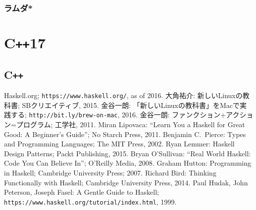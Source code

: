 \documentclass[a5paper,draft]{jsbook}
\newcommand{\programminglanguage}[1]{\textsf{#1}}
\newcommand{\cxx}{\programminglanguage{C}\texttt{++}}
\begin{document}

\section{ラムダ*}

\part{\cxx17}
\chapter{\cxx}

\begin{thebibliography}{99}
 Haskell.org; \texttt{https://www.haskell.org/}, as of 2016.
 大角祐介: 新しいLinuxの教科書; SBクリエイティブ, 2015.
 金谷一朗: 「新しいLinuxの教科書」をMacで実践する; \texttt{http://bit.ly/brew-on-mac}, 2016.
 金谷一朗: ファンクション+アクション=プログラム; 工学社, 2011.
Miran Lipovaca: ``Learn You a Haskell for Great Good: A Beginner's Guide''; No Starch Press, 2011.
 Benjamin C.~Pierce: Types and Programming Languages; The MIT Press, 2002.
 Ryan Lemmer: Haskell Design Patterns; Packt Publishing, 2015.
 Bryan O'Sullivan: ``Real World Haskell: Code You Can Believe In''; O'Reilly Media, 2008.
 Graham Hutton: Programming in Haskell; Cambridge University Press; 2007.
 Richard Bird: Thinking Functionally with Haskell; Cambridge University Press, 2014.
 Paul Hudak, John Peterson, Joseph Fasel: A Gentle Guide to Haskell; \texttt{https://www.haskell.org/tutorial/index.html}, 1999.
\end{thebibliography}
\end{document}
